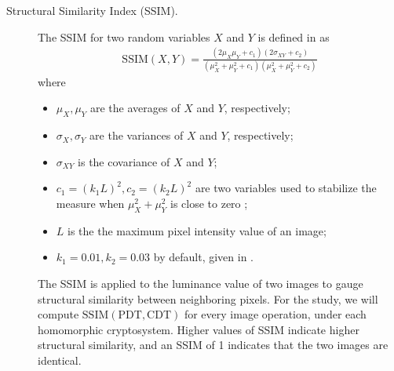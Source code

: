 \begin{description}
	\item [Structural Similarity Index (SSIM).]
	The SSIM for two random variables $X$ and $Y$ is defined in \cite{ahmed_benchmark_2016, akramullah_video_2014} as
	\begin{align}
        \mathrm{SSIM}(X,Y) = \frac{(2\mu_X\mu_Y+c_1)(2\sigma_{XY}+c_2)}{(\mu_X^2+\mu_Y^2+c_1)(\mu_X^2+\mu_Y^2+c_2)}
	\end{align}
	where
	\begin{itemize}
		\item $\mu_X, \mu_Y$ are the averages of $X$ and $Y$, respectively;
		\item $\sigma_X, \sigma_Y$ are the variances of $X$ and $Y$, respectively;
		\item $\sigma_{XY}$ is the covariance of $X$ and $Y$;
		\item $c_1 = (k_1L)^2, c_2 = (k_2L)^2$ are two variables used to stabilize the measure when $\mu_X^2+\mu_Y^2$ is close to zero \cite{akramullah_video_2014};
		\item $L$ is the the maximum pixel intensity value of an image;
		\item $k_1 = 0.01, k_2 = 0.03$ by default, given in \cite{ahmed_benchmark_2016}.
	\end{itemize}
	The SSIM is applied to the luminance value of two images to gauge structural similarity between neighboring pixels.
    For the study, we will compute $\mathrm{SSIM}(\mathrm{PDT}, \mathrm{CDT})$ for every image operation, under each homomorphic cryptosystem. Higher values of SSIM indicate higher structural similarity, and an SSIM of 1 indicates that the two images are identical\cite{ahmed_benchmark_2016}.
\end{description}

